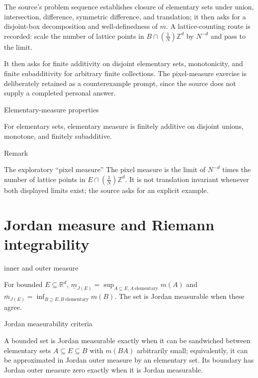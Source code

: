 The source's problem sequence establishes closure of elementary sets under union, intersection, difference, symmetric difference, and translation; it then asks for a disjoint-box decomposition and well-definedness of \(m\). A lattice-counting route is recorded: scale the number of lattice points in \(B \cap \left( \frac{1}{N} \right)\mathbb{Z}^{d}\) by \(N^{- d}\) and pass to the limit.

It then asks for finite additivity on disjoint elementary sets, monotonicity, and finite subadditivity for arbitrary finite collections. The pixel-measure exercise is deliberately retained as a counterexample prompt, since the source does not supply a completed personal answer.

\begin{theorem}{Elementary-measure properties}

For elementary sets, elementary measure is finitely additive on disjoint unions, monotone, and finitely subadditive.

\end{theorem}

\begin{qlremark}{Remark}

The exploratory ``pixel measure'' The pixel measure is the limit of \(N^{- d}\) times the number of lattice points in \(E \cap \left( \frac{1}{N} \right)\mathbb{Z}^{d}\). It is not translation invariant whenever both displayed limits exist; the source asks for an explicit example.

\end{qlremark}

\section{Jordan measure and Riemann integrability}

\begin{definition}{ inner and outer measure}

For bounded \(E \subseteq \mathbb{R}^{d}\), \({\underline{m}}_{J{(E)}} = \sup_{A \subseteq E,A\ \text{elementary}}m(A)\) and \({\bar{m}}_{J{(E)}} = \inf_{B \supseteq E,B\ \text{elementary}}m(B)\). The set is Jordan measurable when these agree.

\end{definition}

\begin{theorem}{Jordan measurability criteria}

A bounded set is Jordan measurable exactly when it can be sandwiched between elementary sets \(A \subseteq E \subseteq B\) with \(m\left( {BA} \right)\) arbitrarily small; equivalently, it can be approximated in Jordan outer measure by an elementary set. Its boundary has Jordan outer measure zero exactly when it is Jordan measurable.

\end{theorem}

